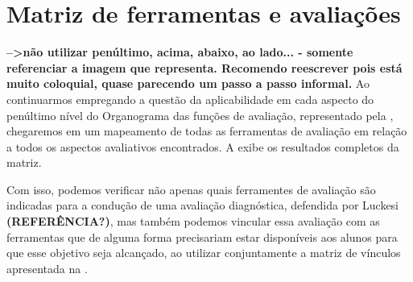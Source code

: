 \section{Matriz de ferramentas e avaliações}%

\textbf{-->não utilizar penúltimo, acima, abaixo, ao lado... - somente referenciar a imagem que representa. Recomendo reescrever pois está muito coloquial, quase parecendo um passo a passo informal.}
Ao continuarmos empregando a questão da aplicabilidade em cada aspecto do penúltimo nível do Organograma das funções de avaliação, representado pela , chegaremos em um mapeamento de todas as ferramentas de avaliação em relação a todos os aspectos avaliativos encontrados. A  exibe os resultados completos da matriz.

Com isso, podemos verificar não apenas quais ferramentes de avaliação são indicadas para a condução de uma avaliação diagnóstica, defendida por Luckesi\textbf{ (REFERÊNCIA?)}, mas também podemos vincular essa avaliação com as ferramentas que de alguma forma precisariam estar disponíveis aos alunos para que esse objetivo seja alcançado, ao utilizar conjuntamente a matriz de vínculos apresentada na .



